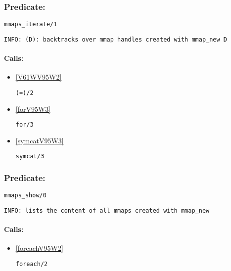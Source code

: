 \subsubsection{Predicate:} \label{mmapsV95WiterateV95W1}

\begin{verbatim}
mmaps_iterate/1
\end{verbatim}

{\small \begin{verbatim}
INFO: (D): backtracks over mmap handles created with mmap_new D

\end{verbatim}}
\paragraph{Calls:} 
\begin{itemize}
\item \ref{V61WV95W2} 
\begin{verbatim}
(=)/2
\end{verbatim}

\item \ref{forV95W3} 
\begin{verbatim}
for/3
\end{verbatim}

\item \ref{symcatV95W3} 
\begin{verbatim}
symcat/3
\end{verbatim}

\end{itemize}

\subsubsection{Predicate:} \label{mmapsV95WshowV95W0}

\begin{verbatim}
mmaps_show/0
\end{verbatim}

{\small \begin{verbatim}
INFO: lists the content of all mmaps created with mmap_new

\end{verbatim}}
\paragraph{Calls:} 
\begin{itemize}
\item \ref{foreachV95W2} 
\begin{verbatim}
foreach/2
\end{verbatim}

\end{itemize}

